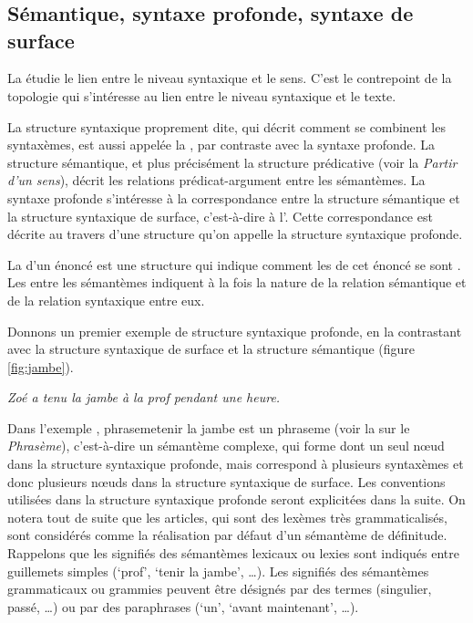 \chapter{}\label{sec:13}

\section{Sémantique, syntaxe profonde, syntaxe de surface}

La  étudie le lien entre le niveau syntaxique et le sens. C’est le contrepoint de la topologie qui s’intéresse au lien entre le niveau syntaxique et le texte.

La structure syntaxique proprement dite, qui décrit comment se combinent les syntaxèmes, est aussi appelée la , par contraste avec la syntaxe profonde. La structure sémantique, et plus précisément la structure prédicative (voir la  \textit{Partir d’un sens}), décrit les relations prédicat-argument entre les sémantèmes. La syntaxe profonde s’intéresse à la correspondance entre la structure sémantique et la structure syntaxique de surface, c’est-à-dire à l’. Cette correspondance est décrite au travers d’une structure qu’on appelle la structure syntaxique profonde.

{La  d’un énoncé est une structure qui indique comment les  de cet énoncé se sont . Les  entre les sémantèmes indiquent à la fois la nature de la relation sémantique et de la relation syntaxique entre eux.}

Donnons un premier exemple de structure syntaxique profonde, en la contrastant avec la structure syntaxique de surface et la structure sémantique (figure \ref{fig:jambe}). 

\ea\label{ex:jambe} \textit{Zoé a tenu la jambe à la prof pendant une heure.}\z

Dans l’exemple , phraseme{tenir la jambe} est un phraseme (voir la  sur le \textit{Phrasème}), c’est-à-dire un sémantème complexe, qui forme dont un seul nœud dans la structure syntaxique profonde, mais correspond à plusieurs syntaxèmes et donc plusieurs nœuds dans la structure syntaxique de surface. Les conventions utilisées dans la structure syntaxique profonde seront explicitées dans la suite. On notera tout de suite que les articles, qui sont des lexèmes très grammaticalisés, sont considérés comme la réalisation par défaut d’un sémantème de définitude. Rappelons que les signifiés des sémantèmes lexicaux ou lexies sont indiqués entre guillemets simples (‘prof’, ‘tenir la jambe’, …). Les signifiés des sémantèmes grammaticaux ou grammies peuvent être désignés par des termes (singulier, passé, …) ou par des paraphrases (‘un’, ‘avant maintenant’, …). 



